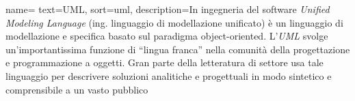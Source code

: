  {
    name=
    text=UML,
    sort=uml,
    description={In ingegneria del software \emph{Unified Modeling Language} (ing. linguaggio di modellazione unificato) è un linguaggio di modellazione e specifica basato sul paradigma object-oriented. L'\emph{UML} svolge un'importantissima funzione di ``lingua franca'' nella comunità della progettazione e programmazione a oggetti. Gran parte della letteratura di settore usa tale linguaggio per descrivere soluzioni analitiche e progettuali in modo sintetico e comprensibile a un vasto pubblico}
}

